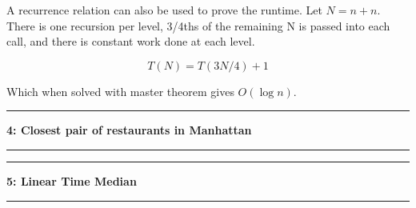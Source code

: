 \documentclass[11pt]{article}
\newcommand\question[2]{\vspace{.25in}\hrule\textbf{#1: #2}\vspace{.5em}\hrule\vspace{.10in}}
\begin{document}
	A recurrence relation can also be used to prove the runtime. Let $N = n + n$. There is one recursion per level, 3/4ths of the remaining N is passed into each call, and there is constant work done at each level.
	
	$$T(N) = T(3N/4) + 1$$
	
	Which when solved with master theorem gives $O(\log n)$.
	

\question{4}{Closest pair of restaurants in Manhattan}

\question{5}{Linear Time Median}
\end{document}
